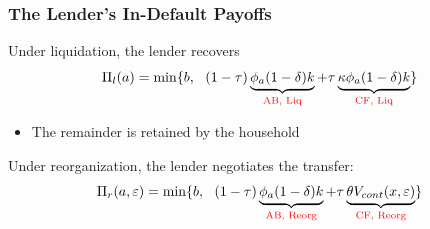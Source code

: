\documentclass[aspectratio=169,xcolor=table]{beamer}
\begin{document}
\begin{frame}[label=Lpayoff] \frametitle{The Lender's In-Default Payoffs \hfill\hyperlink{HH_T}{} }

\begin{table}[h!]
\centering
{}
\label{tab:shares}
\end{table}

Under liquidation, the lender recovers 
$$   \Pi_{l}(a) =  \min \{b, \ \ (1-\tau) \underbrace{\phi_a (1-\delta) k}_{\textcolor{red}{\text{AB, Liq}}} + \tau \underbrace{\kappa \phi_a  (1-\delta) k}_{\textcolor{red}{\text{CF, Liq}}} \} $$
\begin{itemize} \small
    \item The remainder is retained by the household
\end{itemize} \normalsize
Under reorganization, the lender negotiates the transfer: 
$$ \Pi_{r}(a,\varepsilon) = \min \{b, \ \  (1-\tau) \underbrace{\phi_a (1-\delta) k}_{\textcolor{red}{\text{AB, Reorg}}} +\tau \underbrace{\theta V_{cont} (x, \varepsilon)}_{\textcolor{red}{\text{CF, Reorg}}} \} $$ 

 
\end{frame}
\end{document}
